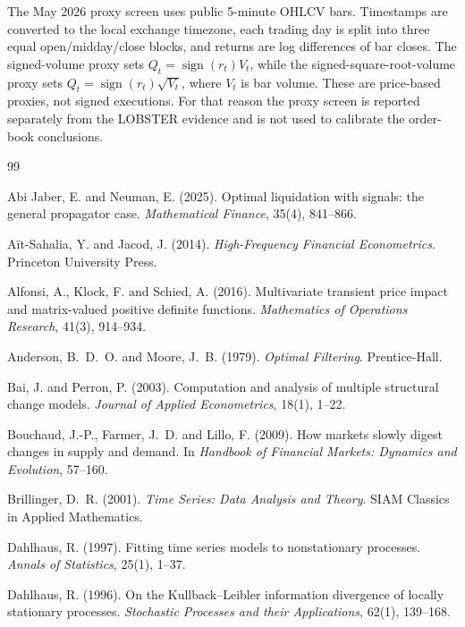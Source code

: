 \documentclass[11pt]{article}
\newcommand{\REV}{}
\begin{document}
\REV
The May 2026 proxy screen uses public 5-minute OHLCV bars. Timestamps are converted to the local exchange timezone, each trading day is split into three equal open/midday/close blocks, and returns are log differences of bar closes. The signed-volume proxy sets $Q_t=\operatorname{sign}(r_t)V_t$, while the signed-square-root-volume proxy sets $Q_t=\operatorname{sign}(r_t)\sqrt{V_t}$, where $V_t$ is bar volume. These are price-based proxies, not signed executions. For that reason the proxy screen is reported separately from the LOBSTER evidence and is not used to calibrate the order-book conclusions.
\begin{thebibliography}{99}

Abi Jaber, E. and Neuman, E. (2025).
\newblock Optimal liquidation with signals: the general propagator case.
\newblock \emph{Mathematical Finance}, 35(4), 841--866.

A{\"i}t-Sahalia, Y. and Jacod, J. (2014).
\newblock \emph{High-Frequency Financial Econometrics}.
\newblock Princeton University Press.

Alfonsi, A., Klock, F. and Schied, A. (2016).
\newblock Multivariate transient price impact and matrix-valued positive definite functions.
\newblock \emph{Mathematics of Operations Research}, 41(3), 914--934.

Anderson, B.~D.~O. and Moore, J.~B. (1979).
\newblock \emph{Optimal Filtering}.
\newblock Prentice-Hall.

Bai, J. and Perron, P. (2003).
\newblock Computation and analysis of multiple structural change models.
\newblock \emph{Journal of Applied Econometrics}, 18(1), 1--22.

Bouchaud, J.-P., Farmer, J.~D. and Lillo, F. (2009).
\newblock How markets slowly digest changes in supply and demand.
\newblock In \emph{Handbook of Financial Markets: Dynamics and Evolution}, 57--160.

Brillinger, D.~R. (2001).
\newblock \emph{Time Series: Data Analysis and Theory}.
\newblock SIAM Classics in Applied Mathematics.

Dahlhaus, R. (1997).
\newblock Fitting time series models to nonstationary processes.
\newblock \emph{Annals of Statistics}, 25(1), 1--37.

Dahlhaus, R. (1996).
\newblock On the Kullback--Leibler information divergence of locally stationary processes.
\newblock \emph{Stochastic Processes and their Applications}, 62(1), 139--168.


\end{thebibliography}
\end{document}

